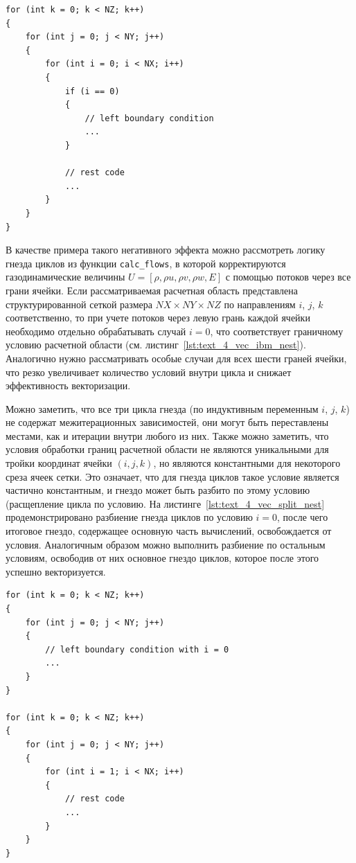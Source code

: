 \begin{lstlisting}[caption={Гнездо циклов с условием во внутреннем цикле.},label={lst:text_4_vec_ibm_nest}]
for (int k = 0; k < NZ; k++)
{
    for (int j = 0; j < NY; j++)
    {
        for (int i = 0; i < NX; i++)
        {
            if (i == 0)
            {
                // left boundary condition
                ...
            }

            // rest code
            ...
        }
    }
}
\end{lstlisting}

В качестве примера такого негативного эффекта можно рассмотреть логику гнезда циклов из функции \texttt{calc\_flows}, в которой корректируются газодинамические величины $U = [\rho, \rho u, \rho v, \rho w, E]$ с помощью потоков через все грани ячейки.
Если рассматриваемая расчетная область представлена структурированной сеткой размера $NX \times NY \times NZ$ по направлениям $i$, $j$, $k$ соответственно, то при учете потоков через левую грань каждой ячейки необходимо отдельно обрабатывать случай $i = 0$, что соответствует граничному условию расчетной области (см. листинг~\ref{lst:text_4_vec_ibm_nest}).
Аналогично нужно рассматривать особые случаи для всех шести граней ячейки, что резко увеличивает количество условий внутри цикла и снижает эффективность векторизации.

Можно заметить, что все три цикла гнезда (по индуктивным переменным $i$, $j$, $k$) не содержат межитерационных зависимостей, они могут быть переставлены местами, как и итерации внутри любого из них.
Также можно заметить, что условия обработки границ расчетной области не являются уникальными для тройки координат ячейки $(i, j, k)$, но являются константными для некоторого среза ячеек сетки.
Это означает, что для гнезда циклов такое условие является частично константным, и гнездо может быть разбито по этому условию (расщепление цикла по условию.
На листинге~\ref{lst:text_4_vec_split_nest} продемонстрировано разбиение гнезда циклов по условию $i = 0$, после чего итоговое гнездо, содержащее основную часть вычислений, освобождается от условия.
Аналогичным образом можно выполнить разбиение по остальным условиям, освободив от них основное гнездо циклов, которое после этого успешно векторизуется.

\begin{lstlisting}[caption={Расщепление гнезда циклов по условию.},label={lst:text_4_vec_split_nest}]
for (int k = 0; k < NZ; k++)
{
    for (int j = 0; j < NY; j++)
    {
        // left boundary condition with i = 0
        ...
    }
}

for (int k = 0; k < NZ; k++)
{
    for (int j = 0; j < NY; j++)
    {
        for (int i = 1; i < NX; i++)
        {
            // rest code
            ...
        }
    }
}
\end{lstlisting}

